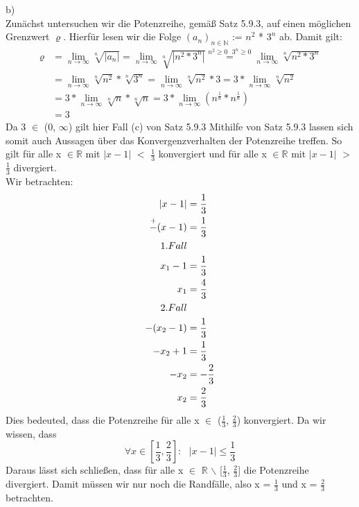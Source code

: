 \documentclass{article}
\begin{document}
\noindent b) \\ 
Zunächst untersuchen wir die Potenzreihe, gemäß Satz 5.9.3, auf einen möglichen Grenzwert $\varrho$.
Hierfür lesen wir die Folge $(a_n)_{n \in \mathds{N}}$ := $n^2$ * $3^n$ ab. Damit gilt:
\begin{align*}
    \varrho & = \lim_{n \to \infty} \sqrt[n]{\left| a_n \right|} = \lim_{n \to \infty} \sqrt[n]{\left| n^2 * 3^n \right|}
    \overset{n^2 \geq 0 \text{ } 3^n \geq 0}{=} \lim_{n \to \infty} \sqrt[n]{n^2 * 3^n} \\
    & = \lim_{n \to \infty} \sqrt[n]{n^2} * \sqrt[n]{3^n} 
    = \lim_{n \to \infty} \sqrt[n]{n^2} * 3  
    = 3 * \lim_{n \to \infty} \sqrt[n]{n^2} \\  
    & = 3 * \lim_{n \to \infty} \sqrt[n]{n} * \sqrt[n]{n}  
    = 3 * \lim_{n \to \infty} (n^{\frac{1}{n}} * n^{\frac{1}{n}}) \\ 
    & = 3 
\end{align*}
Da 3 $\in$ (0, $\infty$) gilt hier Fall (c) von Satz 5.9.3
Mithilfe von Satz 5.9.3 lassen sich somit auch Aussagen über das Konvergenzverhalten der Potenzreihe treffen. So
gilt für alle x $\in \mathds{R}$ mit $\left| x - 1 \right|$ $<$ $\frac{1}{3}$ konvergiert und für alle 
x $\in \mathds{R}$ mit $\left| x - 1 \right|$ $>$ $\frac{1}{3}$ divergiert. \\
Wir betrachten: 
\begin{align*}
    \left| x - 1 \right| & = \frac{1}{3} \\
    \overset{+}{-}(x - 1) & = \frac{1}{3} \\
    \medskip
    1.Fall \\
    x_1 - 1 & = \frac{1}{3} \\ 
    x_1 & = \frac{4}{3} \\ 
    \medskip
    2.Fall \\
    -(x_2 - 1) & = \frac{1}{3} \\ 
    -x_2 + 1 & = \frac{1}{3} \\ 
    -x_2 & = -\frac{2}{3} \\ 
    x_2 & = \frac{2}{3}
\end{align*}
Dies bedeuted, dass die Potenzreihe für alle x $\in$ ($\frac{1}{3}$, $\frac{2}{3}$) konvergiert. Da wir wissen,
dass 
\[
    \forall x \in [\frac{1}{3}, \frac{2}{3}] :\text{ } \left| x - 1 \right| \leq \frac{1}{3} 
\]
Daraus lässt sich schließen, dass für alle x $\in$ $\mathds{R}$ $\backslash$ [$\frac{1}{3}$, $\frac{2}{3}$] die Potenzreihe divergiert.
Damit müssen wir nur noch die Randfälle, also x = $\frac{1}{3}$ und x = $\frac{2}{3}$ betrachten. \\
\end{document}
